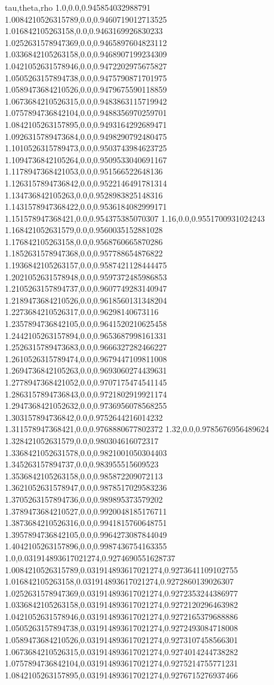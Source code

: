 tau,theta,rho
1.0,0.0,0.945854032988791
1.0084210526315789,0.0,0.9460719012713525
1.016842105263158,0.0,0.9463169926830233
1.0252631578947369,0.0,0.9465897604823112
1.0336842105263158,0.0,0.9468907199234309
1.0421052631578946,0.0,0.9472202975675827
1.0505263157894738,0.0,0.9475790871701975
1.0589473684210526,0.0,0.9479675590118859
1.0673684210526315,0.0,0.9483863115719942
1.0757894736842104,0.0,0.9488356970259701
1.0842105263157895,0.0,0.9493164292689471
1.0926315789473684,0.0,0.9498290792480475
1.1010526315789473,0.0,0.9503743984623725
1.1094736842105264,0.0,0.9509533040691167
1.1178947368421053,0.0,0.951566522648136
1.1263157894736842,0.0,0.9522146491781314
1.134736842105263,0.0,0.9528983825148316
1.1431578947368422,0.0,0.9536184082999171
1.151578947368421,0.0,0.954375385070307
1.16,0.0,0.9551700931024243
1.168421052631579,0.0,0.9560035152881028
1.176842105263158,0.0,0.9568760665870286
1.1852631578947368,0.0,0.957788654876822
1.1936842105263157,0.0,0.9587421128444475
1.2021052631578948,0.0,0.9597372485986853
1.2105263157894737,0.0,0.9607749283140947
1.2189473684210526,0.0,0.9618560131348204
1.2273684210526317,0.0,0.96298140673116
1.2357894736842105,0.0,0.9641520210625458
1.2442105263157894,0.0,0.9653687998161331
1.2526315789473683,0.0,0.9666327282466227
1.2610526315789474,0.0,0.9679447109811008
1.2694736842105263,0.0,0.9693060274439631
1.2778947368421052,0.0,0.9707175474541145
1.2863157894736843,0.0,0.9721802919921174
1.2947368421052632,0.0,0.9736956078568255
1.303157894736842,0.0,0.9752644216014232
1.311578947368421,0.0,0.9768880677802372
1.32,0.0,0.9785676956489624
1.328421052631579,0.0,0.980304616072317
1.3368421052631578,0.0,0.9821001050304403
1.345263157894737,0.0,0.983955515609523
1.3536842105263158,0.0,0.985872209072113
1.3621052631578947,0.0,0.9878517029583236
1.3705263157894736,0.0,0.989895373579202
1.3789473684210527,0.0,0.9920048185176711
1.3873684210526316,0.0,0.9941815760648751
1.3957894736842105,0.0,0.9964273087844049
1.4042105263157896,0.0,0.9987436754163355
1.0,0.031914893617021274,0.9274690551628737
1.0084210526315789,0.031914893617021274,0.9273641109102755
1.016842105263158,0.031914893617021274,0.9272860139026307
1.0252631578947369,0.031914893617021274,0.9272353244386977
1.0336842105263158,0.031914893617021274,0.9272120296463982
1.0421052631578946,0.031914893617021274,0.9272165379688886
1.0505263157894738,0.031914893617021274,0.9272493084718008
1.0589473684210526,0.031914893617021274,0.9273107458566301
1.0673684210526315,0.031914893617021274,0.9274014244738282
1.0757894736842104,0.031914893617021274,0.9275214755771231
1.0842105263157895,0.031914893617021274,0.9276715276937466
